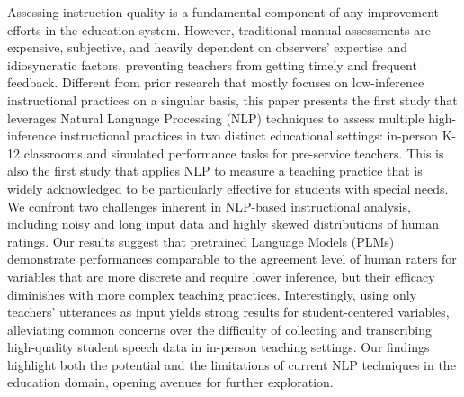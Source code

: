 Assessing instruction quality is a fundamental component of any improvement efforts in the education system. However, traditional manual assessments are expensive, subjective, and heavily dependent on observers' expertise and idiosyncratic factors, preventing teachers from getting timely and frequent feedback. Different from prior research that mostly focuses on low-inference instructional practices on a singular basis, this paper presents the first study that leverages Natural Language Processing (NLP) techniques to assess multiple high-inference instructional practices in two distinct educational settings: in-person K-12 classrooms and simulated performance tasks for pre-service teachers. This is also the first study that applies NLP to measure a teaching practice that is widely acknowledged to be particularly effective for students with special needs. We confront two challenges inherent in NLP-based instructional analysis, including noisy and long input data and highly skewed distributions of human ratings. Our results suggest that pretrained Language Models (PLMs) demonstrate performances comparable to the agreement level of human raters for variables that are more discrete and require lower inference, but their efficacy diminishes with more complex teaching practices.  Interestingly, using only teachers' utterances as input yields strong results for student-centered variables, alleviating common concerns over the difficulty of collecting and transcribing high-quality student speech data in in-person teaching settings. Our findings highlight both the potential and the limitations of current NLP techniques in the education domain, opening avenues for further exploration.